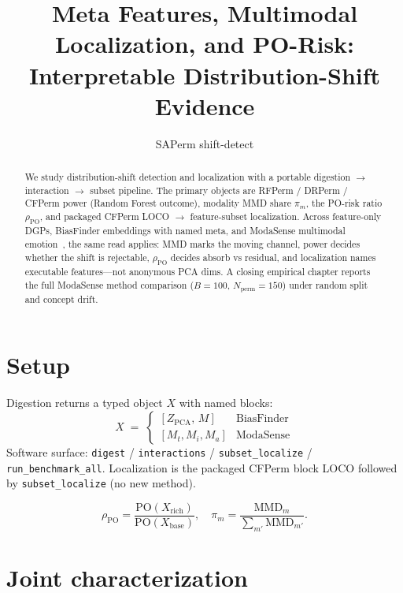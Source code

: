 \documentclass[11pt]{article}
\title{Meta Features, Multimodal Localization, and PO-Risk:\\
Interpretable Distribution-Shift Evidence}
\author{SAPerm shift-detect}
\date{}
\begin{document}
\maketitle

\begin{abstract}
\noindent
We study distribution-shift detection and localization with a portable
digestion $\to$ interaction $\to$ subset pipeline.
The primary objects are RFPerm / DRPerm / CFPerm power (Random Forest
outcome), modality MMD share $\pi_m$, the PO-risk ratio
$\rho_{\mathrm{PO}}$, and packaged CFPerm LOCO $\to$ feature-subset
localization.
Across feature-only DGPs, BiasFinder embeddings with named meta, and
ModaSense multimodal emotion~\cite{modasense_emotion_2026}, the same
read applies: MMD marks the moving channel, power decides whether the
shift is rejectable, $\rho_{\mathrm{PO}}$ decides absorb vs residual, and
localization names executable features---not anonymous PCA dims.
A closing empirical chapter reports the full ModaSense method comparison
($B{=}100$, $N_{\mathrm{perm}}{=}150$) under random split and concept drift.
\end{abstract}

\section{Setup}
Digestion returns a typed object $X$ with named blocks:
\[
X \;=\;
\begin{cases}
[Z_{\mathrm{PCA}},\,M] & \text{BiasFinder}\\[2pt]
[M_t,M_i,M_a] & \text{ModaSense}
\end{cases}
\]
Software surface: \texttt{digest} / \texttt{interactions} /
\texttt{subset\_localize} / \texttt{run\_benchmark\_all}.
Localization is the packaged CFPerm block LOCO followed by
\texttt{subset\_localize} (no new method).

\[
\rho_{\mathrm{PO}}=\frac{\mathrm{PO}(X_{\mathrm{rich}})}{\mathrm{PO}(X_{\mathrm{base}})},
\quad
\pi_m=\frac{\mathrm{MMD}_m}{\sum_{m'}\mathrm{MMD}_{m'}}.
\]

\section{Joint characterization}
\label{sec:joint}

\end{document}
